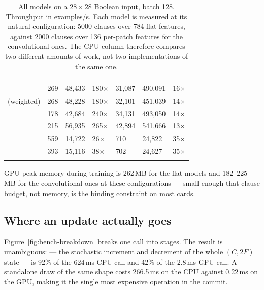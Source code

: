 \begin{table}[htbp]
\centering
\small\sffamily\sloppy
\caption{All models on a $28\times28$ Boolean input, batch 128. Throughput in examples/s.
  Each model is measured at its natural configuration: 5000 clauses over 784 flat features,
  against 2000 clauses over 136 per-patch features for the convolutional ones. The CPU column
  therefore compares two different amounts of work, not two implementations of the same one.}
\label{tab:zoo}
\begin{tabularx}{\linewidth}{@{}>{\raggedright\arraybackslash}X R{1.5cm}R{1.6cm}R{1.3cm}R{1.6cm}R{1.7cm}R{1.3cm}@{}}
\ttoprule
&  & \\
 &  &  &  &  &  & \\
\ttmidrule
{}            & 269 & 48{,}433 & 180$\times$ & 31{,}087 & 490{,}091 & 16$\times$\\
 (weighted) & 268 & 48{,}228 & 180$\times$ & 32{,}101 & 451{,}039 & 14$\times$\\
   & 178 & 42{,}684 & 240$\times$ & 34{,}131 & 493{,}050 & 14$\times$\\
  & 215 & 56{,}935 & 265$\times$ & 42{,}894 & 541{,}666 & 13$\times$\\
        & 559 & 14{,}722 &  26$\times$ &      710 &  24{,}822 & 35$\times$\\
 & 393 & 15{,}116 & 38$\times$ & 702 & 24{,}627 & 35$\times$\\
\ttbotrule
\end{tabularx}
\end{table}

GPU peak memory during training is 262\,MB for the flat models and 182--225\,MB for the
convolutional ones at these configurations --- small enough that clause budget, not memory, is
the binding constraint on most cards.

\subsection{Where an update actually goes}

Figure~\ref{fig:bench-breakdown} breaks one  call into stages. The result is
unambiguous:  --- the stochastic increment and decrement of the whole
$(C,2F)$ state --- is 92\% of the 624\,ms CPU call and 42\% of the 2.8\,ms GPU call. A
standalone  draw of the same shape costs 266.5\,ms on the CPU against
0.22\,ms on the GPU, making it the single most expensive operation in the commit.

